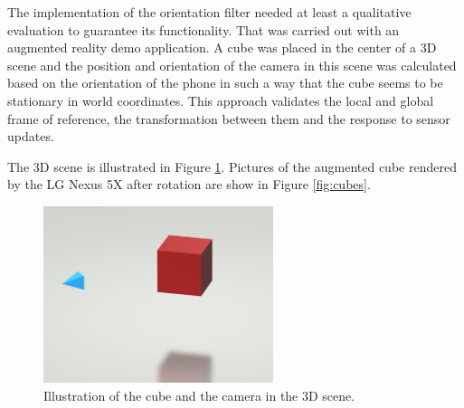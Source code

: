 The implementation of the orientation filter needed at least a qualitative evaluation to guarantee its functionality. That was carried out with an augmented reality demo application. A cube was placed in the center of a 3D scene and the position and orientation of the camera in this scene was calculated based on the orientation of the phone in such a way that the cube seems to be stationary in world coordinates. This approach validates the local and global frame of reference, the transformation between them and the response to sensor updates.

The 3D scene is illustrated in Figure \ref{fig:cube_scene}. Pictures of the augmented cube rendered by the LG Nexus 5X after rotation are show in Figure \ref{fig:cubes}.

\begin{figure}[hbt!]
    \centering
    \includegraphics[width=0.6\textwidth]{figures/cube_scene.png}
    \caption{Illustration of the cube and the camera in the 3D scene.}
    \label{fig:cube_scene}
\end{figure}


